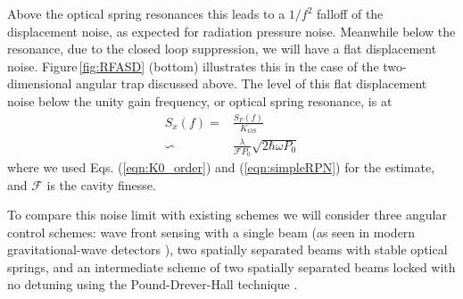 Above the optical spring resonances this leads to a $1/f^2$ falloff of the displacement noise, as expected for radiation pressure noise. Meanwhile below the resonance, due to the closed loop suppression, we will have a flat displacement noise. %
Figure\,\ref{fig:RFASD} (bottom) illustrates this in the case of the two-dimensional angular trap discussed above. The level of this flat displacement noise below the unity gain frequency, or optical spring resonance, is at
\begin{align}
\label{eqn_newraddisp}
S_x(f) =& \frac{S_F(f)}{K_{OS}} \\
\backsim & \frac{\lambda}{\mathcal{F}{P_0}}\sqrt{2 \hbar \omega P_0}
\end{align}
where we used Eqs. (\ref{eqn:K0_order}) and (\ref{eqn:simpleRPN}) for the estimate, and $\mathcal{F}$ is the cavity finesse.

To compare this noise limit with existing schemes we will consider three angular control schemes: wave front sensing with a single beam (as seen in modern gravitational-wave detectors \cite{Dooley13, Hirose10}), two spatially separated beams with stable optical springs, and an intermediate scheme of two spatially separated beams locked with no detuning using the Pound-Drever-Hall technique \cite{Black01}. 

